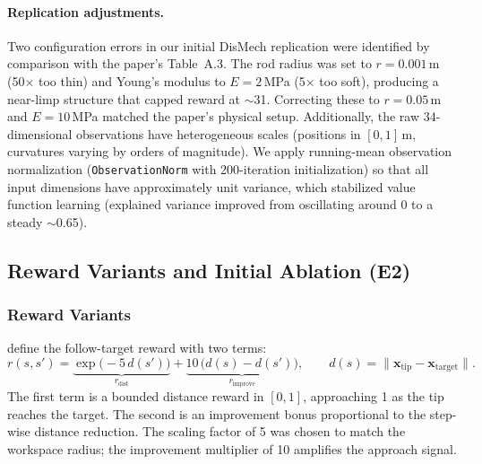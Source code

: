 \documentclass[11pt]{article}
\begin{document}
\paragraph{Replication adjustments.}
Two configuration errors in our initial DisMech replication were identified by comparison with the paper's Table~A.3.
The rod radius was set to $r = 0.001$\,m (50$\times$ too thin) and Young's modulus to $E = 2$\,MPa (5$\times$ too soft), producing a near-limp structure that capped reward at ${\sim}$31.
Correcting these to $r = 0.05$\,m and $E = 10$\,MPa matched the paper's physical setup.
Additionally, the raw 34-dimensional observations have heterogeneous scales (positions in $[0, 1]$\,m, curvatures varying by orders of magnitude).
We apply running-mean observation normalization (\texttt{ObservationNorm} with 200-iteration initialization) so that all input dimensions have approximately unit variance, which stabilized value function learning (explained variance improved from oscillating around $0$ to a steady ${\sim}$0.65).

\subsection{Reward Variants and Initial Ablation (E2)}
\label{sec:rl-dismech:ablation}

\subsubsection{Reward Variants}
\label{sec:rl-dismech:reward}

\citet{Choi2025} define the follow-target reward with two terms:
\begin{equation}
  r(s, s') = \underbrace{\exp\!\bigl(-5\,d(s')\bigr)}_{r_{\text{dist}}} + \underbrace{10\,\bigl(d(s) - d(s')\bigr)}_{r_{\text{improve}}}, \qquad d(s) = \lVert \mathbf{x}_{\text{tip}} - \mathbf{x}_{\text{target}} \rVert.
  \label{eq:reward-original}
\end{equation}
The first term is a bounded distance reward in $[0, 1]$, approaching 1 as the tip reaches the target.
The second is an improvement bonus proportional to the step-wise distance reduction.
The scaling factor of 5 was chosen to match the workspace radius; the improvement multiplier of 10 amplifies the approach signal.
\end{document}
